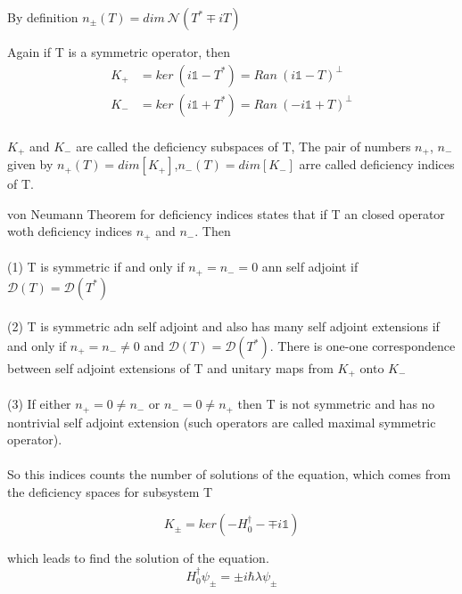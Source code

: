 \documentclass[12pt, letterpaper]{article}
\newcommand*{\1}{\hspace{1pt}}
\begin{document}
        By definition $n_{\pm} (T) = dim \ \mathcal{N}(T^{*} \mp iT )$ 

        Again if T is a symmetric operator, then
        \begin{equation}
            \begin{split}
                K_{+} &= ker \ (i\mathds{1}-T^{*}) = Ran \ (i\mathds{1} - T) ^{\perp} \\
                K_{-} &= ker \ (i \mathds{1} +T^{*}) = Ran \ (-i\mathds{1} + T) ^{\perp} \\ 
            \end{split}
        \end{equation}
        
        $K_{+}$ and $K_{-}$ are called the deficiency subspaces of T, The pair of numbers $n_{+}$, $n_{-}$ given by $n_{+}(T) = dim[K_{+}]$,$n_{-}(T) = dim[K_{-}]$ arre called
        deficiency indices of T.

        von Neumann Theorem for deficiency indices states that if T an closed operator woth deficiency indices $n_{+}$ and $n_{-}$. Then \\ 
        \\
         (1) T is symmetric if and only if $n_{+} = n_{-} = 0$ ann self adjoint if $\mathcal{D}(T)=\mathcal{D}(T^{*})$ \\ 
         \\ 
         (2) T is symmetric adn self adjoint and also has many self adjoint extensions if and only if $n_{+}=n_{-}\neq 0$ and  $\mathcal{D}(T)=\mathcal{D}(T^{*})$.
         There is one-one correspondence between self adjoint extensions of T and unitary maps from $K_{+}$ onto $K_{-}$ \\ 
         \\ 
         (3) If either $n_{+}=0 \neq n_{-}$ or $n_{-}=0 \neq n_{+}$ then T is not symmetric and has no nontrivial self adjoint extension (such operators are called 
         maximal symmetric operator). \\
         \\
        So this indices counts the number of solutions of the equation, which comes from the deficiency spaces for subsystem T

        \begin{equation}
            K_{\pm} = ker \left(-H_{0}^{\dagger} - \mp i \mathds{1}\right)
        \end{equation}

        which leads to find the solution of the equation.
        \begin{equation}
            H_{0} ^{\dagger} \psi_{\pm} = \pm i \hbar \lambda \psi_{\pm}
        \end{equation}
\end{document}
